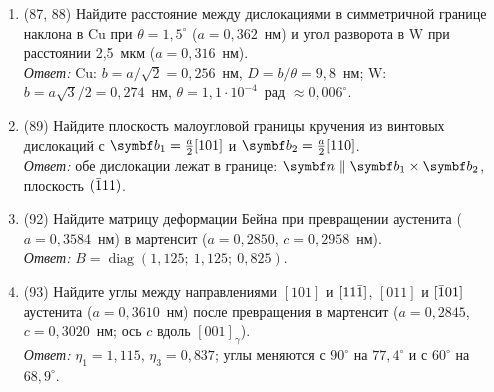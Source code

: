 \begin{enumerate}[label={\sffamily\bfseries\color{fmHead}\arabic*.}]
дислокация $\frac a2[1\br10]$ в плоскости $(111)$?\\
\emph{Ответ:} $\frac a2[1\br10]\to\frac a6[2\br1\br1]+\frac a6[1\br21]$.
\item (87, 88) Найдите расстояние между дислокациями в симметричной
границе наклона в Cu при $\theta=1{,}5^\circ$ ($a=0{,}362$~нм) и угол
разворота в W при расстоянии 2,5~мкм ($a=0{,}316$~нм).\\
\emph{Ответ:} Cu: $b=a/\sqrt2=0{,}256$~нм, $D=b/\theta=9{,}8$~нм;
W: $b=a\sqrt3/2=0{,}274$~нм, $\theta=1{,}1\cdot10^{-4}$~рад $\approx0{,}006^\circ$.
\item (89) Найдите плоскость малоугловой границы кручения из винтовых
дислокаций с $\vb b_1=\frac a2[101]$ и $\vb b_2=\frac a2[110]$.\\
\emph{Ответ:} обе дислокации лежат в границе: $\vb n\parallel\vb b_1\times\vb b_2$,
плоскость $(\bar{1}11)$.
\item (92) Найдите матрицу деформации Бейна при превращении аустенита
($a=0{,}3584$~нм) в мартенсит ($a=0{,}2850$, $c=0{,}2958$~нм).\\
\emph{Ответ:} $B=\operatorname{diag}(1{,}125;\ 1{,}125;\ 0{,}825)$.
\item (93) Найдите углы между направлениями $[101]$ и $[11\bar{1}]$, $[011]$ и
$[\bar{1}01]$ аустенита ($a=0{,}3610$~нм) после превращения в мартенсит
($a=0{,}2845$, $c=0{,}3020$~нм; ось $c$ вдоль $[001]_\gamma$).\\
\emph{Ответ:} $\eta_1=1{,}115$, $\eta_3=0{,}837$; углы меняются с
$90^\circ$ на $77{,}4^\circ$ и с $60^\circ$ на $68{,}9^\circ$.
\end{enumerate}

